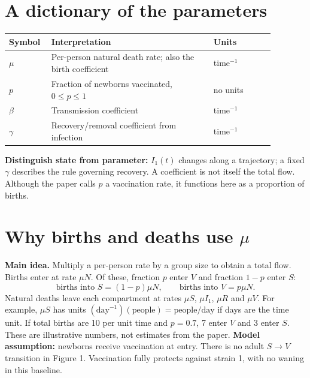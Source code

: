 \documentclass[11pt]{article}
\newcommand{\idea}[1]{\textbf{Main idea.} #1}
\begin{document}
\section{A dictionary of the parameters}
\begin{center}\begin{tabular}{p{0.11\linewidth}p{0.56\linewidth}p{0.21\linewidth}}\toprule
Symbol & Interpretation & Units\\\midrule
$\mu$ & Per-person natural death rate; also the birth coefficient & time$^{-1}$\\
$p$ & Fraction of newborns vaccinated, $0\leq p\leq1$ & no units\\
$\beta$ & Transmission coefficient & time$^{-1}$\\
$\gamma$ & Recovery/removal coefficient from infection & time$^{-1}$\\\bottomrule
\end{tabular}\end{center}
\textbf{Distinguish state from parameter:} $I_1(t)$ changes along a trajectory; a fixed $\gamma$ describes the rule governing recovery. A coefficient is not itself the total flow. Although the paper calls $p$ a vaccination rate, it functions here as a proportion of births.
\newpage
\section{Why births and deaths use $\mu$}
\idea{Multiply a per-person rate by a group size to obtain a total flow.}
Births enter at rate $\mu N$. Of these, fraction $p$ enter $V$ and fraction $1-p$ enter $S$:
\[
\text{births into }S=(1-p)\mu N,\qquad
\text{births into }V=p\mu N.
\]
Natural deaths leave each compartment at rates $\mu S$, $\mu I_1$, $\mu R$ and $\mu V$. For example, $\mu S$ has units $(\text{day}^{-1})(\text{people})=\text{people/day}$ if days are the time unit.
If total births are 10 per unit time and $p=0.7$, 7 enter $V$ and 3 enter $S$. These are illustrative numbers, not estimates from the paper.
\textbf{Model assumption:} newborns receive vaccination at entry. There is no adult $S\to V$ transition in Figure 1. Vaccination fully protects against strain 1, with no waning in this baseline.
\end{document}
